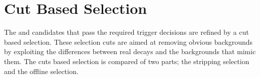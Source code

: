 


\section{Cut Based Selection}
\label{sec:cut_based_sel}
The \bsmumu and \bhh candidates that pass the required trigger decisions are refined by a cut based selection. These selection cuts are aimed at removing obvious backgrounds by exploiting the differences between real \bsmumu decays and the backgrounds that mimic them. The cuts based selection is compared of two parts; the stripping selection and the offline selection. 

